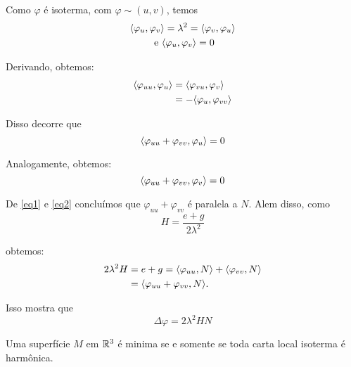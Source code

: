 \begin{demonstracao}
	Como $\varphi$ é isoterma, com $\varphi \sim (u, v)$, temos
	\begin{gather*}
		\langle \varphi_u,\varphi_v \rangle = \lambda^2 = \langle \varphi_v,\varphi_u \rangle \\
		\text{ e } \langle \varphi_u,\varphi_v \rangle = 0
	\end{gather*}
	
	Derivando, obtemos:
	\begin{align*}
		\langle \varphi_{uu},\varphi_u \rangle &= \langle \varphi_{vu},\varphi_v \rangle\\
		&= - \langle \varphi_u,\varphi_{vv} \rangle
	\end{align*}
	
	Disso decorre que
	\begin{equation}\label{eq1}
		\langle \varphi_{uu} + \varphi_{vv},\varphi_u \rangle = 0
	\end{equation}
	
	Analogamente, obtemos:
	\begin{equation}\label{eq2}
		\langle \varphi_{uu} + \varphi_{vv},\varphi_v \rangle = 0
	\end{equation}
	
	De \ref{eq1} e \ref{eq2} concluímos que $\varphi_{uu} + \varphi_{vv}$ é paralela a $N$. Alem disso, como
	\begin{equation}
		H = \frac{e+g}{2 \lambda^2}
	\end{equation}
	
	obtemos:
	\begin{align*}
		2 \lambda^2 H &= e + g = \langle \varphi_{uu},N \rangle + \langle \varphi_{vv},N \rangle\\
		&= \langle \varphi_{uu} + \varphi_{vv},N \rangle.
	\end{align*}
	
	Isso mostra que
	\begin{equation}
		\Delta \varphi = 2 \lambda^2 H N
	\end{equation}
\end{demonstracao}

\begin{corolario}
	Uma superfície $M$ em $\mathbb{R}^3$ é minima se e somente se toda carta local isoterma é harmônica.
\end{corolario}

